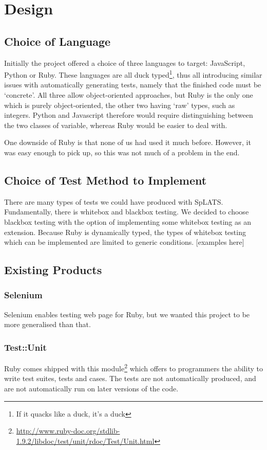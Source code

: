 \chapter{Design}

\section{Choice of Language}
  Initially the project offered a choice of three languages to target: JavaScript, Python or Ruby.
  These languages are all duck typed\footnote{If it quacks like a duck, it's a duck}, thus all introducing similar issues with automatically generating tests, namely that the finished code must be `concrete'.
  All three allow object-oriented approaches, but Ruby is the only one which is purely object-oriented, the other two having `raw' types, such as integers.
  Python and Javascript therefore would require distinguishing between the two classes of variable, whereas Ruby would be easier to deal with.

  One downside of Ruby is that none of us had used it much before.
  However, it was easy enough to pick up, so this was not much of a problem in the end.

\section{Choice of Test Method to Implement}
  There are many types of tests we could have produced with SpLATS.
  Fundamentally, there is whitebox and blackbox testing.
  We decided to choose blackbox testing with the option of implementing some whitebox testing as an extension.
  Because Ruby is dynamically typed, the types of whitebox testing which can be implemented are limited to generic conditions.
  [examples here]

\section{Existing Products}
  \subsection{Selenium}
    Selenium enables testing web page for Ruby, but we wanted this project to be more generalised than that.

  \subsection{Test::Unit}
    Ruby comes shipped with this module\footnote{\url{http://www.ruby-doc.org/stdlib-1.9.2/libdoc/test/unit/rdoc/Test/Unit.html}} which offers to programmers the ability to write test suites, tests and cases.
    The tests are not automatically produced, and are not automatically run on later versions of the code.

